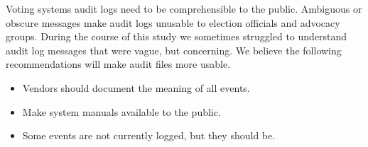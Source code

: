 \smvertspace
{}
Voting systems audit logs need to be comprehensible to the public. Ambiguous or
obscure messages make audit 
logs unusable to election officials and advocacy groups. During the course of
this study we sometimes struggled to understand audit log messages that were
vague, but concerning. We believe the following recommendations
will make audit files more usable.

\smvertspace
\begin{itemize}
\item Vendors should document the meaning of all events. %

\begin{comment}
\textbf{Accuracy of date and time logging needs improvement.} Some voting
systems allow for system settings to be adjusted by election workers and
therefore are prone to human error. Time and date setting is one of the voting
machine parameters that is usually adjusted manually at election central in
preparation for precinct deployment. When the time of the machine setting is
incorrect, it becomes difficult to recreate election day events. Audit logs are
ground truth for election disputes; their accuracy is key. 
\end{comment}

\item Make system manuals available to the public. %

\item Some events are not currently logged, but they should be. %
\end{itemize}



